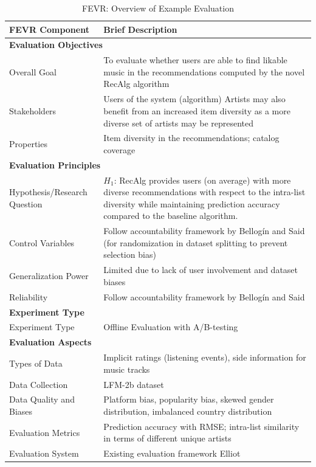 \documentclass[\myFontSize,oneside,english,hidelinks,a4paper]{article}
\begin{document}
%
%
%
%
%
\begin{table}[h!]
\centering
\caption{FEVR: Overview of Example Evaluation}
\begin{tabular}{lp{10cm}}
\hline
\textbf{FEVR Component} & \textbf{Brief Description} \\ \hline
\multicolumn{2}{|l|}{\textbf{Evaluation Objectives}} \\ \hline
Overall Goal & To evaluate whether users are able to find likable music in the recommendations computed by the novel RecAlg algorithm \\ \hline
Stakeholders & Users of the system (algorithm) \newline Artists may also benefit from an increased item diversity as a more diverse set of artists may be represented \\ \hline
Properties & Item diversity in the recommendations; catalog coverage \\ \hline
\multicolumn{2}{|l|}{\textbf{Evaluation Principles}} \\ \hline
Hypothesis/Research Question & \( H_1 \): RecAlg provides users (on average) with more diverse recommendations with respect to the intra-list diversity while maintaining prediction accuracy compared to the baseline algorithm. \\ \hline
Control Variables & Follow accountability framework by Bellogín and Said \cite{24} (for randomization in dataset splitting to prevent selection bias) \\ \hline
Generalization Power & Limited due to lack of user involvement and dataset biases \\ \hline
Reliability & Follow accountability framework by Bellogín and Said \cite{24} \\ \hline
\multicolumn{2}{|l|}{\textbf{Experiment Type}} \\ \hline
Experiment Type & Offline Evaluation with A/B-testing \\ \hline
\multicolumn{2}{|l|}{\textbf{Evaluation Aspects}} \\ \hline
Types of Data & Implicit ratings (listening events), side information for music tracks \\ \hline
Data Collection & LFM-2b dataset \cite{194} \\ \hline
Data Quality and Biases & Platform bias, popularity bias, skewed gender distribution, imbalanced country distribution \\ \hline
Evaluation Metrics & Prediction accuracy with RMSE; intra-list similarity in terms of different unique artists \\ \hline
Evaluation System & Existing evaluation framework Elliot \cite{14} \\ \hline
\end{tabular}
\end{table}
%
%
\end{document}
